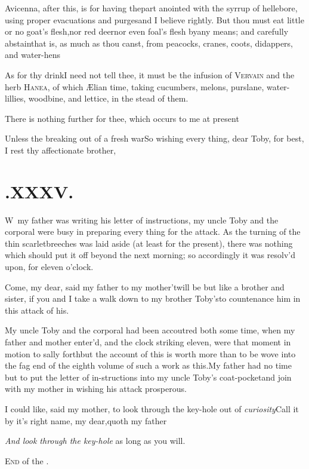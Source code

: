 \documentclass{article}
\begin{document}
Avicenna, after this, is for having the\break part anointed
with the syrrup of helle\-bore, using proper evacuations and
purges\tsh and I believe rightly. But thou must eat little
or no goat’s flesh,\break nor red deer\tsh nor even
foal’s flesh by\break any means; and carefully
abstain\tsh that is, as much as thou canst, from peacocks,
cranes, coots, didappers, and water-hens\tsh

As for thy drink\tsk I need not tell thee, it must be the
infusion of \textsc{Vervain} and the herb
\textsc{Hanea}, of which Ælian\pb 
{}
time, taking cucumbers, melons, purs\-lane, water-lillies, woodbine, and lettice,
in the stead of them.

There is nothing further for thee, which occurs to me at
present\tsh

\tsh Unless the breaking out of a fresh
war\tsh So wishing every thing, dear Toby, for
best,\\[3pt]
\indent I rest thy affectionate brother,\\[3pt]

\section{.\enspace XXXV.}

\lettrine{W}{\,} my father was writing his
letter of instructions, my uncle Toby and the corporal were
busy in preparing every thing for the attack. As the turning of the
thin scarlet\pb breeches was laid aside (at least for the present),
there was nothing which should put it off beyond the next morning;
so accordingly it was resolv’d upon, for eleven
o’clock.

Come, my dear, said my father to my mother\tsk ’twill be
but like a brother and sister, if you and I take a walk down to my
brother Toby’s\tsh to countenance him in this
attack of his.

\vskip -6pt

My uncle Toby and the corporal had been accoutred both some time, when my father and
mother enter’d, and the clock striking eleven, were that moment in motion to sally
forth\tsk but the account of this is worth more than to be wove into the fag end of
the eighth volume of such a work as this.\tsh My father had no time but to put the
letter of in-\pb structions into my uncle Toby’s coat-pocket\tsh and join with my mother
in wishing his attack prosperous.


I could like, said my mother, to look through the key-hole out
of \textit{curiosity}\tsh\break Call it by it’s right name, my
dear,\break quoth my father\tsk 

\textit{And look through the key-hole} as long as you will.

\vfill
\centerline{\textsc{End} of the .}
\vfill
\end{document}
